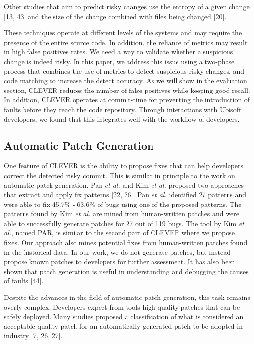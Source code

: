 \documentclass[sigconf]{acmart}
\begin{document}
Other studies that aim to predict risky changes use the entropy of a
given change [13, 43] and the size of the change combined with files
being changed [20].

These techniques operate at different levels of the systems and may
require the presence of the entire source code. In addition, the
reliance of metrics may result in high false positives rates. We need a
way to validate whether a suspicious change is indeed risky. In this
paper, we address this issue using a two-phase process that combines the
use of metrics to detect suspicious risky changes, and code matching to
increase the detect accuracy. As we will show in the evaluation section,
CLEVER reduces the number of false positives while keeping good recall.
In addition, CLEVER operates at commit-time for preventing the
introduction of faults before they reach the code repository. Through
interactions with Ubisoft developers, we found that this integrates well
with the workflow of developers.

\subsection{Automatic Patch
Generation}\label{automatic-patch-generation}

One feature of CLEVER is the ability to propose fixes that can help
developers correct the detected risky commit. This is similar in
principle to the work on automatic patch generation. Pan \emph{et al.}
and Kim \emph{et al.} proposed two approaches that extract and apply fix
patterns [22, 36]. Pan \emph{et al.} identified 27 patterns and were
able to fix 45.7\% - 63.6\% of bugs using one of the proposed patterns.
The patterns found by Kim \emph{et al.} are mined from human-written
patches and were able to successfully generate patches for 27 out of 119
bugs. The tool by Kim \emph{et al.}, named PAR, is similar to the second
part of CLEVER where we propose fixes. Our approach also mines potential
fixes from human-written patches found in the historical data. In our
work, we do not generate patches, but instead propose known patches to
developers for further assessment. It has also been shown that patch
generation is useful in understanding and debugging the causes of faults
[44].

Despite the advances in the field of automatic patch generation, this
task remains overly complex. Developers expect from tools high quality
patches that can be safely deployed. Many studies proposed a
classification of what is considered an acceptable quality patch for an
automatically generated patch to be adopted in industry [7, 26, 27].
\end{document}
